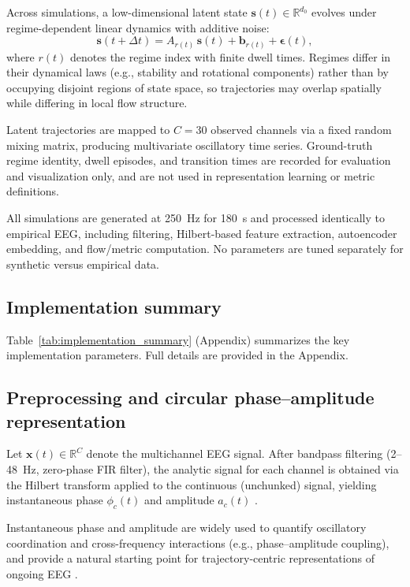\documentclass[5p,twocolumn,authoryear]{elsarticle}
\begin{document}
Across simulations, a low-dimensional latent state $\mathbf{s}(t) \in \mathbb{R}^{d_0}$ evolves under regime-dependent linear dynamics with additive noise:
\begin{equation}
\mathbf{s}(t+\Delta t) = A_{r(t)}\,\mathbf{s}(t) + \mathbf{b}_{r(t)} + \boldsymbol{\epsilon}(t),
\end{equation}
where $r(t)$ denotes the regime index with finite dwell times. Regimes differ in their dynamical laws (e.g., stability and rotational components) rather than by occupying disjoint regions of state space, so trajectories may overlap spatially while differing in local flow structure.

Latent trajectories are mapped to $C=30$ observed channels via a fixed random mixing matrix, producing multivariate oscillatory time series. Ground-truth regime identity, dwell episodes, and transition times are recorded for evaluation and visualization only, and are not used in representation learning or metric definitions.

All simulations are generated at 250~Hz for 180~s and processed identically to empirical EEG, including filtering, Hilbert-based feature extraction, autoencoder embedding, and flow/metric computation. No parameters are tuned separately for synthetic versus empirical data.

\subsection{Implementation summary}
\label{sec:impl_summary}

Table~\ref{tab:implementation_summary} (Appendix) summarizes the key implementation parameters. Full details are provided in the Appendix.

\subsection{Preprocessing and circular phase--amplitude representation}

Let $\mathbf{x}(t) \in \mathbb{R}^{C}$ denote the multichannel EEG signal. After bandpass filtering (2--48~Hz, zero-phase FIR filter), the analytic signal for each channel is obtained via the Hilbert transform applied to the continuous (unchunked) signal, yielding instantaneous phase $\phi_c(t)$ and amplitude $a_c(t)$ \citep{Boashash1992}.

Instantaneous phase and amplitude are widely used to quantify oscillatory coordination and cross-frequency interactions (e.g., phase--amplitude coupling), and provide a natural starting point for trajectory-centric representations of ongoing EEG \citep{Canolty2006,Tort2010}.
\end{document}
